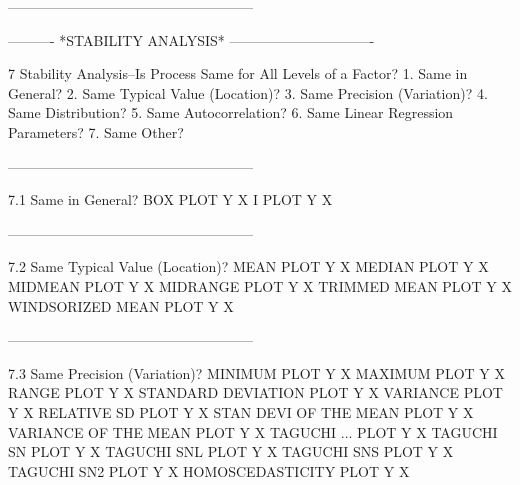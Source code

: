 -----------------------------------------------------
 
 
 
 
 
 
 
 
 
 
 
 
 
 
 
 
 
 
 
 
 
 
 
 
 
 
 
 
 
 
 
 
 
 
 
 
 
 
 
 
 
 
 
 
 
 
 
 
----------  *STABILITY ANALYSIS*  -------------------------------
 
7
Stability Analysis--Is Process Same for All Levels of a Factor?
   1. Same in General?
   2. Same Typical Value (Location)?
   3. Same Precision (Variation)?
   4. Same Distribution?
   5. Same Autocorrelation?
   6. Same Linear Regression Parameters?
   7. Same Other?
 
-----------------------------------------------------
 
7.1
Same in General?
      BOX PLOT Y X
      I PLOT Y X
 
-----------------------------------------------------
 
7.2
Same Typical Value (Location)?
      MEAN PLOT Y X
      MEDIAN PLOT Y X
      MIDMEAN PLOT Y X
      MIDRANGE PLOT Y X
      TRIMMED MEAN PLOT Y X
      WINDSORIZED MEAN PLOT Y X
 
-----------------------------------------------------
 
7.3
Same Precision (Variation)?
      MINIMUM PLOT Y X
      MAXIMUM PLOT Y X
      RANGE PLOT Y X
      STANDARD DEVIATION PLOT Y X
      VARIANCE PLOT Y X
      RELATIVE SD PLOT Y X
      STAN DEVI OF THE MEAN PLOT Y X
      VARIANCE OF THE MEAN PLOT Y X
      TAGUCHI ... PLOT Y X
         TAGUCHI SN PLOT Y X
         TAGUCHI SNL PLOT Y X
         TAGUCHI SNS PLOT Y X
         TAGUCHI SN2 PLOT Y X
         HOMOSCEDASTICITY PLOT Y X
 
